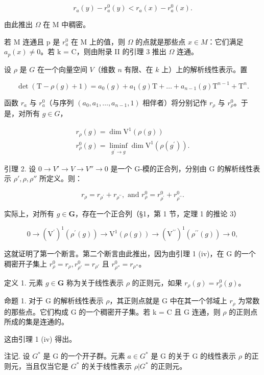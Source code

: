 \[
r _ {a} (y) - r _ {a} ^ {0} (y) <   r _ {a} (x) - r _ {a} ^ {0} (x).
\]

由此推出 \(\Omega\) 在 M 中稠密。

若 M 连通且 p 是 \(r_{a}^{0}\) 在 M 上的值，则 \(\Omega\) 的点就是那些点 \(x \in M\)：它们满足 \(a_{p}(x) \neq 0\)。若 k = C，则由附录 II 的引理 3 推出 \(\Omega\) 连通。

设 \(\rho\) 是 \(G\) 在一个向量空间 \(V\)（维数 \(n\) 有限、在 \(k\) 上）上的解析线性表示。置

\[
\det (\mathrm{T} - \rho (g) + 1) = a _ {0} (g) + a _ {1} (g) \mathrm{T} + \dots + a _ {n - 1} (g) \mathrm{T} ^ {n - 1} + \mathrm{T} ^ {n}.
\]

函数 \(r_a\) 与 \(r_a^0\)（与序列 \((a_0, a_1, \ldots, a_{n-1}, 1)\) 相伴者）将分别记作 \(r_\rho\) 与 \(r_\rho^0\)。于是，对所有 \(g \in G\)，

\[
\begin{array}{l} r _ {\rho} (g) = \dim \mathrm{V} ^ {1} (\rho (g)) \\ r _ {\rho} ^ {0} (g) = \liminf _ {g ^ {\prime} \to g} \dim \mathrm{V} ^ {1} (\rho (g ^ {\prime})). \end{array}
\]

引理 2. 设 \(0 \to V' \to V \to V'' \to 0\) 是一个 G-模的正合列，分别由 G 的解析线性表示 \(\rho', \rho, \rho''\) 所定义。则：

\[
r _ {\rho} = r _ {\rho^ {\prime}} + r _ {\rho^ {\prime \prime}}, \text { and } r _ {\rho} ^ {0} = r _ {\rho^ {\prime}} ^ {0} + r _ {\rho^ {\prime \prime}} ^ {0}.
\]

实际上，对所有 \(g \in \mathbf{G}\)，存在一个正合列（§1，第 1 节，定理 1 的推论 3）

\[
0 \to (\mathrm{V} ^ {\prime}) ^ {1} (\rho^ {\prime} (g)) \to \mathrm{V} ^ {1} (\rho (g)) \to (\mathrm{V} ^ {\prime \prime}) ^ {1} (\rho^ {\prime \prime} (g)) \to 0,
\]

这就证明了第一个断言。第二个断言由此推出，因为由引理 1 (iv)，在 G 的一个稠密开子集上 \(r_{\rho}^{0} = r_{\rho}, r_{\rho'}^{0} = r_{\rho'}\) 且 \(r_{\rho''}^{0} = r_{\rho''}\)。

定义 1. 元素 \(g \in \mathbf{G}\) 称为关于线性表示 \(\rho\) 的正则元，如果 \(r_{\rho}(g) = r_{\rho}^{0}(g)\)。

命题 1. 对于 G 的解析线性表示 \(\rho\)，其正则点就是 G 中在其一个邻域上 \(r_{\rho}\) 为常数的那些点。它们构成 G 的一个稠密开子集。若 k = C 且 G 连通，则 \(\rho\) 的正则点所成的集是连通的。

这由引理 1 (iv) 得出。

注记. 设 \(G^{*}\) 是 G 的一个开子群。元素 \(a \in G^{*}\) 是 G 的关于 G 的线性表示 \(\rho\) 的正则元，当且仅当它是 \(G^{*}\) 的关于线性表示 \(\rho|G^{*}\) 的正则元。


